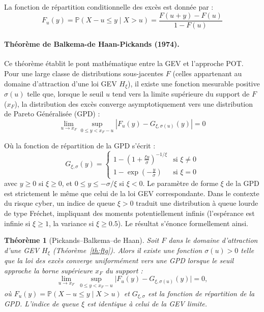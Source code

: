 \documentclass[11pt,a4paper]{article}
\theoremstyle{navystyle}
\newtheorem{theorem}{Théorème}[section]
\theoremstyle{navydef}
\newcommand{\Prob}{\mathbb{P}}
\begin{document}
La fonction de répartition conditionnelle des excès est donnée par :
\begin{equation}
F_u(y) = \mathbb{P}(X - u \le y \mid X > u) = \frac{F(u+y) - F(u)}{1 - F(u)}
\end{equation}

\paragraph{Théorème de Balkema-de Haan-Pickands (1974).} Ce théorème établit le pont mathématique entre la GEV et l'approche POT. Pour une large classe de distributions sous-jacentes $F$ (celles appartenant au domaine d'attraction d'une loi GEV $H_\xi$), il existe une fonction mesurable positive $\sigma(u)$ telle que, lorsque le seuil $u$ tend vers la limite supérieure du support de $F$ ($x_F$), la distribution des excès converge asymptotiquement vers une distribution de Pareto Généralisée (GPD) :
\begin{equation}
\lim_{u \to x_F} \sup_{0 \le y < x_F - u} \left| F_u(y) - G_{\xi, \sigma(u)}(y) \right| = 0
\end{equation}

Où la fonction de répartition de la GPD s'écrit :
\begin{equation}
G_{\xi, \sigma}(y) = 
\begin{cases} 
1 - \left(1 + \frac{\xi y}{\sigma}\right)^{-1/\xi} & \text{si } \xi \neq 0 \\
1 - \exp\left(-\frac{y}{\sigma}\right) & \text{si } \xi = 0 
\end{cases}
\end{equation}
avec $y \ge 0$ si $\xi \ge 0$, et $0 \le y \le -\sigma/\xi$ si $\xi < 0$. Le paramètre de forme $\xi$ de la GPD est strictement le même que celui de la loi GEV correspondante. Dans le contexte du risque cyber, un indice de queue $\xi > 0$ traduit une distribution à queue lourde de type Fréchet, impliquant des moments potentiellement infinis (l'espérance est infinie si $\xi \ge 1$, la variance si $\xi \ge 0.5$). Le résultat s'énonce formellement ainsi.

\begin{theorem}[Pickands--Balkema--de Haan]\label{th:balkema}
Soit $F$ dans le domaine d'attraction d'une GEV $H_\xi$ (Théorème~\ref{th:ftg}). Alors il existe une fonction $\sigma(u)>0$ telle que la loi des excès converge uniformément vers une GPD lorsque le seuil approche la borne supérieure $x_F$ du support :
\begin{equation}
\lim_{u\to x_F}\ \sup_{0\le y< x_F-u}\bigl|F_u(y)-G_{\xi,\sigma(u)}(y)\bigr|=0,
\end{equation}
où $F_u(y)=\Prob(X-u\le y\mid X>u)$ et $G_{\xi,\sigma}$ est la fonction de répartition de la GPD. L'indice de queue $\xi$ est identique à celui de la GEV limite.
\end{theorem}
\end{document}

